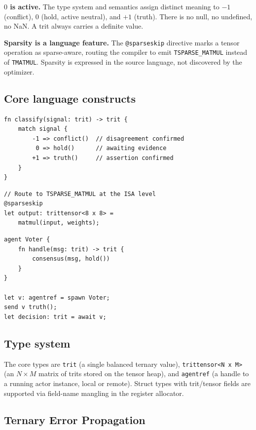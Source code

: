 \documentclass[11pt,a4paper]{article}
\begin{document}
\textbf{$0$ is active.} The type system and semantics assign distinct meaning
to $-1$ (conflict), $0$ (hold, active neutral), and $+1$ (truth). There is no
null, no undefined, no NaN. A trit always carries a definite value.

\textbf{Sparsity is a language feature.} The \texttt{@sparseskip} directive
marks a tensor operation as sparse-aware, routing the compiler to emit
\texttt{TSPARSE\_MATMUL} instead of \texttt{TMATMUL}. Sparsity is expressed
in the source language, not discovered by the optimizer.

\subsection{Core language constructs}

\begin{lstlisting}[caption={Ternary classifier with exhaustive match}]
fn classify(signal: trit) -> trit {
    match signal {
        -1 => conflict()  // disagreement confirmed
         0 => hold()      // awaiting evidence
        +1 => truth()     // assertion confirmed
    }
}
\end{lstlisting}

\begin{lstlisting}[caption={Sparse matrix multiply with @sparseskip}]
// Route to TSPARSE_MATMUL at the ISA level
@sparseskip
let output: trittensor<8 x 8> =
    matmul(input, weights);
\end{lstlisting}

\begin{lstlisting}[caption={Actor model for ternary message passing}]
agent Voter {
    fn handle(msg: trit) -> trit {
        consensus(msg, hold())
    }
}

let v: agentref = spawn Voter;
send v truth();
let decision: trit = await v;
\end{lstlisting}

\subsection{Type system}

The core types are \texttt{trit} (a single balanced ternary value),
\texttt{trittensor<N x M>} (an $N \times M$ matrix of trits stored on the
tensor heap), and \texttt{agentref} (a handle to a running actor instance,
local or remote). Struct types with trit/tensor fields are supported via
field-name mangling in the register allocator.

\subsection{Ternary Error Propagation}
\label{subsec:propagate}
\end{document}
